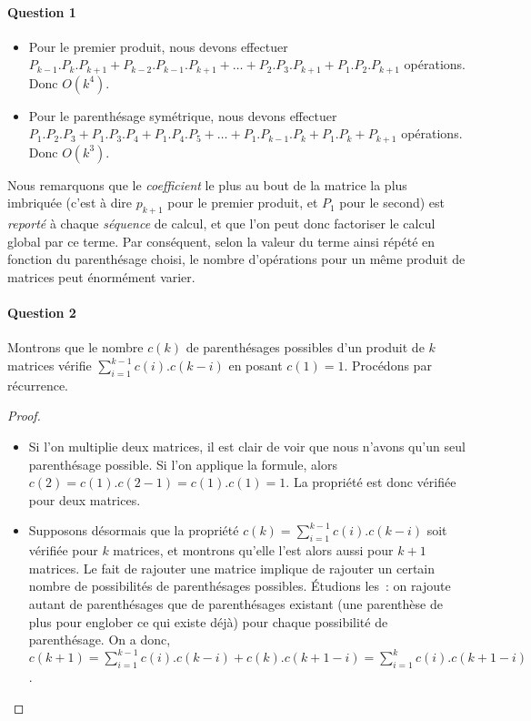 \paragraph{Question 1}

\begin{itemize}
\item Pour le premier produit, nous devons effectuer $P_{k-1}.P_k.P_{k+1}
  + P_{k-2}.P_{k-1}.P_{k+1} + \dots + P_2.P_3.P_{k+1} +
  P_1.P_2.P_{k+1}$ opérations. Donc $O(k^4)$.
\item Pour le parenthésage symétrique, nous devons effectuer $P_1.P_2.P_3
  + P_1.P_3.P_4 + P_1.P_4.P_5 + \dots + P_1.P_{k-1}.P_{k} +
  P_1.P_k+P_{k+1}$ opérations. Donc $O(k^3)$.
\end{itemize}

Nous remarquons que le \textit{coefficient} le plus au bout de la matrice
la plus imbriquée (c'est à dire $p_{k+1}$ pour le premier produit, et $P_1$
pour le second) est \textit{reporté} à chaque \textit{séquence} de
calcul, et que l'on peut donc factoriser le calcul global par ce
terme. Par conséquent, selon la valeur du terme ainsi répété en
fonction du parenthésage choisi, le nombre d'opérations pour un même
produit de matrices peut énormément varier.

\paragraph{Question 2}

Montrons que le nombre $c(k)$ de parenthésages possibles d'un produit
de $k$ matrices vérifie $\sum_{i=1}^{k-1}c(i).c(k-i)$ en posant
$c(1)=1$. Procédons par récurrence.

\begin{proof}
\begin{itemize}
\item Si l'on multiplie deux matrices, il est clair de voir que nous
  n'avons qu'un seul parenthésage possible. Si l'on applique la
  formule, alors $c(2) = c(1).c(2-1) = c(1).c(1) = 1$. La propriété
  est donc vérifiée pour deux matrices.
\item Supposons désormais que la propriété $c(k) =
  \sum_{i=1}^{k-1}c(i).c(k-i)$ soit vérifiée pour $k$ matrices, et
  montrons qu'elle l'est alors aussi pour $k+1$ matrices. Le fait de
  rajouter une matrice implique de rajouter un certain nombre de
  possibilités de parenthésages possibles. Étudions les~: on rajoute
  autant de parenthésages que de parenthésages existant (une
  parenthèse de plus pour englober ce qui existe déjà) pour chaque
  possibilité de parenthésage. On a donc, $c(k+1)
  =\sum_{i=1}^{k-1}c(i).c(k-i)+c(k).c(k+1-i)= \sum_{i=1}^{k}c(i).c(k+1-i)$.
\end{itemize}
\end{proof}

